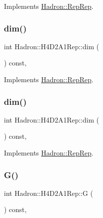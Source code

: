 Implements \mbox{\hyperlink{structHadron_1_1RepRep_a92c8802e5ed7afd7da43ccfd5b7cd92b}{Hadron\+::\+Rep\+Rep}}.

\mbox{\label{structHadron_1_1H4D2A1Rep_ae600fd0e83fd097e98797656ed4371e5}} 
\subsubsection{\texorpdfstring{dim()}{dim()}\hspace{0.1cm}{\footnotesize\ttfamily [2/3]}}
{\footnotesize\ttfamily int Hadron\+::\+H4\+D2\+A1\+Rep\+::dim (\begin{DoxyParamCaption}{ }\end{DoxyParamCaption}) const\hspace{0.3cm}{\ttfamily [inline]}, {\ttfamily [virtual]}}



Implements \mbox{\hyperlink{structHadron_1_1RepRep_a92c8802e5ed7afd7da43ccfd5b7cd92b}{Hadron\+::\+Rep\+Rep}}.

\mbox{\label{structHadron_1_1H4D2A1Rep_ae600fd0e83fd097e98797656ed4371e5}} 
\subsubsection{\texorpdfstring{dim()}{dim()}\hspace{0.1cm}{\footnotesize\ttfamily [3/3]}}
{\footnotesize\ttfamily int Hadron\+::\+H4\+D2\+A1\+Rep\+::dim (\begin{DoxyParamCaption}{ }\end{DoxyParamCaption}) const\hspace{0.3cm}{\ttfamily [inline]}, {\ttfamily [virtual]}}



Implements \mbox{\hyperlink{structHadron_1_1RepRep_a92c8802e5ed7afd7da43ccfd5b7cd92b}{Hadron\+::\+Rep\+Rep}}.

\mbox{\label{structHadron_1_1H4D2A1Rep_adf7afdc418ccacac0b436a1edc71c4be}} 
\subsubsection{\texorpdfstring{G()}{G()}\hspace{0.1cm}{\footnotesize\ttfamily [1/2]}}
{\footnotesize\ttfamily int Hadron\+::\+H4\+D2\+A1\+Rep\+::G (\begin{DoxyParamCaption}{ }\end{DoxyParamCaption}) const\hspace{0.3cm}{\ttfamily [inline]}, {\ttfamily [virtual]}}

